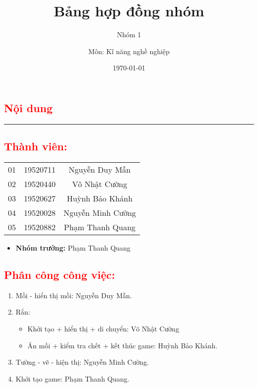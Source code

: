 \documentclass{article}
\title{\Huge{\textbf{Bảng hợp đồng nhóm}}}
\author{Nhóm 1}
\author{Môn: Kĩ năng nghề nghiệp}
\date{\today}
\begin{document}
\maketitle

\textcolor{red}{\chapter*{\Huge{{Nội dung}}}}

\noindent
{\color{cyan} \rule{\linewidth}{0.5mm} }


\textcolor{red}{\section{\Large{Thành viên:}}}

\begin{center}
    \begin{tabular}{|c|c|c|}
         \hline
         \color{red}{STT} & \color{red}{MSSV} & \color{red}{Họ và tên} \\
         \hline
         01 & 19520711 & Nguyễn Duy Mẫn \\
         \hline
         02 & 19520440 & Võ Nhật Cường \\
         \hline
         03 & 19520627 & Huỳnh Bảo Khánh \\
         \hline
         04 & 19520028 & Nguyễn Minh Cường \\
         \hline
         05 & 19520882 & Phạm Thanh Quang \\
         \hline
    \end{tabular}
\end{center}
\begin{itemize}
    \item \textbf{Nhóm trưởng: } Phạm Thanh Quang
\end{itemize}

\textcolor{red}{\section{\Large{Phân công công việc:}}}

\begin{enumerate}
    \item Mồi - hiển thị mồi: Nguyễn Duy Mẫn.
    \item Rắn: \par
        \begin{itemize}
            \item Khởi tạo + hiển thị + di chuyển: Võ Nhật Cường
            \item Ăn mồi + kiểm tra chết + kết thúc game: Huỳnh Bảo Khánh. 
        \end{itemize}
    \item Tường - vẽ - hiện thị: Nguyễn Minh Cường. 
    \item Khởi tạo game: Phạm Thanh Quang. 
\end{enumerate}
\end{document}
